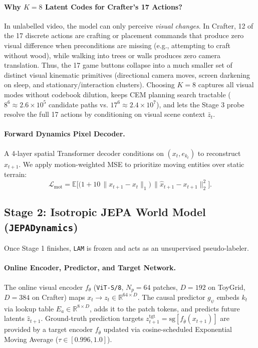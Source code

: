 \documentclass[11pt,letterpaper]{article}
\begin{document}
\paragraph{Why $K=8$ Latent Codes for Crafter's 17 Actions?}
In unlabelled video, the model can only perceive \emph{visual changes}. In Crafter, 12 of the 17 discrete actions are crafting or placement commands that produce zero visual difference when preconditions are missing (e.g., attempting to craft without wood), while walking into trees or walls produces zero camera translation. Thus, the 17 game buttons collapse into a much smaller set of distinct visual kinematic primitives (directional camera moves, screen darkening on sleep, and stationary/interaction clusters). Choosing $K=8$ captures all visual modes without codebook dilution, keeps CEM planning search tractable ($8^6 \approx 2.6\times 10^5$ candidate paths vs. $17^6 \approx 2.4\times 10^7$), and lets the Stage 3 probe resolve the full 17 actions by conditioning on visual scene context $\bar{z}_t$.

\paragraph{Forward Dynamics Pixel Decoder.}
A 4-layer spatial Transformer decoder conditions on $(x_t, e_{k_t})$ to reconstruct $\hat{x}_{t+1}$. We apply motion-weighted MSE to prioritize moving entities over static terrain:
\begin{equation}
  \mathcal{L}_{\text{mot}} = \mathbb{E}\Big[\big(1 + 10\,\|x_{t+1} - x_t\|_1\big)\,\|\hat{x}_{t+1} - x_{t+1}\|_2^2\Big].
\end{equation}

\subsection{Stage 2: Isotropic JEPA World Model (\texttt{JEPADynamics})}
Once Stage 1 finishes, \texttt{LAM} is frozen and acts as an unsupervised pseudo-labeler.

\paragraph{Online Encoder, Predictor, and Target Network.}
The online visual encoder $f_\theta$ (\texttt{ViT-S/8}, $N_p=64$ patches, $D=192$ on ToyGrid, $D=384$ on Crafter) maps $x_t \to z_t \in \mathbb{R}^{64 \times D}$. The causal predictor $g_\psi$ embeds $k_t$ via lookup table $E_a \in \mathbb{R}^{8 \times D}$, adds it to the patch tokens, and predicts future latents $\hat{z}_{t+1}$. Ground-truth prediction targets $z_{t+1}^{\text{tgt}} = \text{sg}[f_{\bar{\theta}}(x_{t+1})]$ are provided by a target encoder $f_{\bar{\theta}}$ updated via cosine-scheduled Exponential Moving Average ($\tau \in [0.996, 1.0]$).
\end{document}
